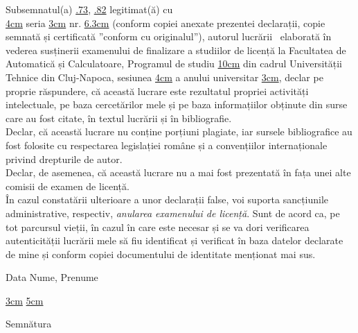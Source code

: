 \begin{minipage}{\linewidth}
	Subsemnatul(a) \uline{.73\linewidth},
	\uline{.82\linewidth}
	legitimat(ă) cu\\ \uline{4cm} seria \uline{3cm} nr. \uline{6.3cm}
	(conform copiei anexate prezentei declarații, copie semnată și certificată ”conform cu originalul”), autorul lucrării\
	\uline{\linewidth}
	\uline{\linewidth}
	\uline{\linewidth}
	elaborată în vederea susținerii examenului de finalizare a studiilor de licență la Facultatea de Automatică și Calculatoare, Programul de studiu \uline{10cm} din cadrul Universității Tehnice din Cluj-Napoca, sesiunea \uline{4cm} a anului universitar \uline{3cm}, declar pe proprie răspundere, că această lucrare este rezultatul propriei activități intelectuale, pe baza cercetărilor mele și pe baza informațiilor obținute din surse care au fost citate, în textul lucrării și în bibliografie.\\
	Declar, că această lucrare nu conține porțiuni plagiate, iar sursele bibliografice au fost folosite cu respectarea legislației române și a convențiilor internaționale privind drepturile de autor.\\
	Declar, de asemenea, că această lucrare nu a mai fost prezentată în fața unei alte comisii de examen de licență.\\
	În cazul constatării ulterioare a unor declarații false, voi suporta sancțiunile administrative, respectiv, \emph{anularea examenului de licență}.
	Sunt de acord ca, pe tot parcursul vieții, în cazul în care este necesar și se va dori verificarea autenticității lucrării mele să fiu identificat și verificat în baza datelor declarate de mine și conform copiei documentului de identitate menționat mai sus.
\end{minipage}
\vspace{1.5cm}

Data \hspace{8cm} Nume, Prenume

\vspace{0.5cm}

\uline{3cm} \hspace{5cm} \uline{5cm}

\vspace{1cm}
\hspace{9.4cm}Semnătura
\newpage
